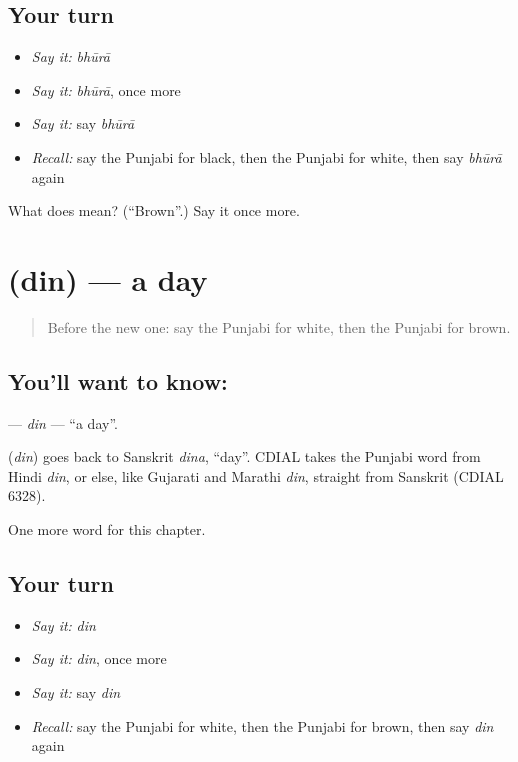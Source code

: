 \subsection*{Your turn}
\begin{itemize}
\raggedright
  \item \emph{Say it:} \emph{bhūrā}
  \item \emph{Say it:} \emph{bhūrā}, once more
  \item \emph{Say it:} say \emph{bhūrā}
  \item \emph{Recall:} say the Punjabi for black, then the Punjabi for white, then say \emph{bhūrā} again
\end{itemize}

\begin{tcolorbox}[breakable,colback=teal!4,colframe=teal!35!black,title={Before you move on}]
What does  mean? (\textquotedblleft{}Brown\textquotedblright{}.) Say it once more.
\end{tcolorbox}
\section[\texorpdfstring{\pa{ਦਿਨ} (din)}{ਦਿਨ (din)}]{ (din) — a day}

\label{lesson:PA-C85-din}



\begin{quote}
Before the new one: say the Punjabi for white, then the Punjabi for brown.
\end{quote}

\subsection*{You'll want to know: }
\textbf{} — \emph{din} — \textquotedblleft{}a day\textquotedblright{}.

\begin{cousinweb}
\textbf{} (\emph{din}) goes back to Sanskrit \emph{dina}, \textquotedblleft{}day\textquotedblright{}. CDIAL takes the Punjabi word from Hindi \emph{din}, or else, like Gujarati and Marathi \emph{din}, straight from Sanskrit (CDIAL 6328).
\end{cousinweb}

\begin{grammarlens}[title={What you've built}]
One more word for this chapter.
\end{grammarlens}

\subsection*{Your turn}
\begin{itemize}
\raggedright
  \item \emph{Say it:} \emph{din}
  \item \emph{Say it:} \emph{din}, once more
  \item \emph{Say it:} say \emph{din}
  \item \emph{Recall:} say the Punjabi for white, then the Punjabi for brown, then say \emph{din} again
\end{itemize}


